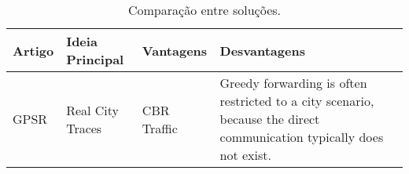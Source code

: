 \documentclass{article}
\begin{document}
\begin{table*}[htb]
\begin{center} 
  \begin{tabular}{p{2cm}p{4cm}p{4cm}p{4cm}}
  \toprule
  \textbf{Artigo} &
  \textbf{Ideia Principal} &
  \textbf{Vantagens} &
  \textbf{Desvantagens}\\
  \midrule
  GPSR &
  Real City Traces &
  CBR Traffic &
  Greedy forwarding is often restricted to a city scenario, because the direct communication typically does not exist.\\
  \bottomrule
  \end{tabular}
\end{center}
\normalsize
\caption{Comparação entre soluções.}
\label{Table:RoutingProtocols}
\end{table*}





\end{document}
